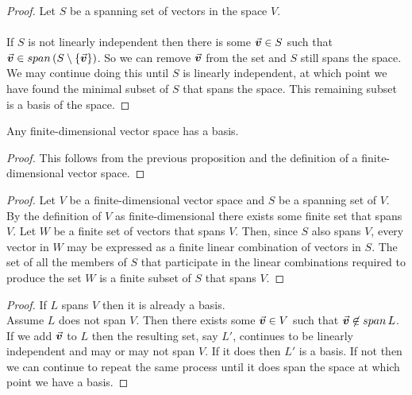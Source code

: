 \documentclass[MathsNotesBase.tex]{subfiles}
\begin{document}
{	\bigskip
	\begin{proof}
		Let $S$ be a spanning set of vectors in the space $V$.\\\\
		If $S$ is not linearly independent then there is some ${ \vec{\bm{v}} \in S }$ such that \\${ \vec{\bm{v}} \in span\,(S \setminus \{\vec{\bm{v}}\}) }$. So we can remove $\vec{\bm{v}}$ from the set and $S$ still spans the space. We may continue doing this until $S$ is linearly independent, at which point we have found the minimal subset of $S$ that spans the space. This remaining subset is a basis of the space.
	\end{proof}
	\begin{corollary}
		Any finite-dimensional vector space has a basis.
	\end{corollary}
	\begin{proof}
		This follows from the previous proposition and the definition of a finite-dimensional vector space.
	\end{proof}

	\medskip
	\begin{proof}
		Let $V$ be a finite-dimensional vector space and $S$ be a spanning set of $V$. By the definition of $V$ as finite-dimensional there exists some finite set that spans $V$. Let $W$ be a finite set of vectors that spans $V$. Then, since $S$ also spans $V$, every vector in $W$ may be expressed as a finite linear combination of vectors in $S$. The set of all the members of $S$ that participate in the linear combinations required to produce the set $W$ is a finite subset of $S$ that spans $V$.
	\end{proof}
	
	\medskip
	\begin{proof}
		If $L$ spans $V$ then it is already a basis.\\
		Assume $L$ does not span $V$. Then there exists some ${ \vec{\bm{v}} \in V }$ such that ${ \vec{\bm{v}} \not\in span\,L }$. If we add $\vec{\bm{v}}$ to $L$ then the resulting set, say $L'$, continues to be linearly independent and may or may not span $V$. If it does then $L'$ is a basis. If not then we can continue to repeat the same process until it does span the space at which point we have a basis.
	\end{proof}

}
\end{document}
